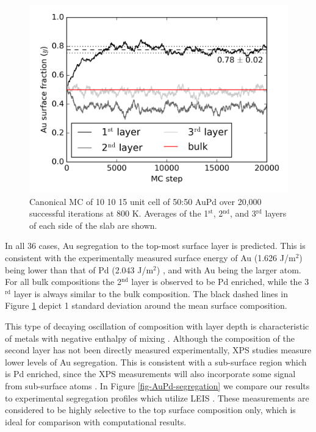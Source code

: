 \documentclass[12pt,oneside]{cmuthesis}
\begin{document}
\begin{figure}[htbp]
\centering
\includegraphics[width=5.5in]{./images/AuPd-MC.png}
\caption{\label{fig-AuPd-MC}
Canonical MC of 10 \texttimes{} 10 \texttimes{} 15 unit cell of 50:50 AuPd over 20,000 successful iterations at 800 K. Averages of the 1\(^{\text{st}}\), 2\(^{\text{nd}}\), and 3\(^{\text{rd}}\) layers of each side of the slab are shown.}
\end{figure}

In all 36 cases, Au segregation to the top-most surface layer is predicted. This is consistent with the experimentally measured surface energy of Au (1.626 J/m\(^{\text{2}}\)) being lower than that of Pd (2.043 J/m\(^{\text{2}}\)) \cite{mezey-1982-surfac-free}, and with Au being the larger atom. For all bulk compositions the 2\(^{\text{nd}}\) layer is observed to be Pd enriched, while the 3\(^{\text{rd}}\) layer is always similar to the bulk composition. The black dashed lines in Figure \ref{fig-AuPd-MC} depict \textpm{} 1 standard deviation around the mean surface composition.

This type of decaying oscillation of composition with layer depth is characteristic of metals with negative enthalpy of mixing \cite{dowben-1990-surfac-segreg-phenom}. Although the composition of the second layer has not been directly measured experimentally, XPS studies measure lower levels of Au segregation. This is consistent with a sub-surface region which is Pd enriched, since the XPS measurements will also incorporate some signal from sub-surface atoms \cite{yi-2005-compos-struc}. In Figure \ref{fig-AuPd-segregation} we compare our results to  experimental segregation profiles which utilize LEIS \cite{swartzfager-1981-differ-sputt,yi-2005-compos-struc}. These measurements are considered to be highly selective to the top surface composition only, which is ideal for comparison with computational results.
\end{document}
